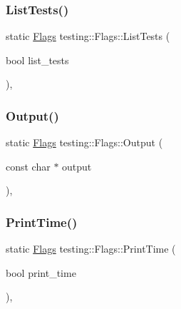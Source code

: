 \mbox{\label{structtesting_1_1Flags_a825a5d763a31fe6c28f543990bd336df}} 
\subsubsection{\texorpdfstring{ListTests()}{ListTests()}}
{\footnotesize\ttfamily static \mbox{\hyperlink{structtesting_1_1Flags}{Flags}} testing\+::\+Flags\+::\+List\+Tests (\begin{DoxyParamCaption}\item[{bool}]{list\+\_\+tests }\end{DoxyParamCaption})\hspace{0.3cm}{\ttfamily [inline]}, {\ttfamily [static]}}

\mbox{\label{structtesting_1_1Flags_a507916734a6d7ff2dd02891d7849f2d3}} 
\subsubsection{\texorpdfstring{Output()}{Output()}}
{\footnotesize\ttfamily static \mbox{\hyperlink{structtesting_1_1Flags}{Flags}} testing\+::\+Flags\+::\+Output (\begin{DoxyParamCaption}\item[{const char $\ast$}]{output }\end{DoxyParamCaption})\hspace{0.3cm}{\ttfamily [inline]}, {\ttfamily [static]}}

\mbox{\label{structtesting_1_1Flags_af4dc8454995fb3691399a049e95de179}} 
\subsubsection{\texorpdfstring{PrintTime()}{PrintTime()}}
{\footnotesize\ttfamily static \mbox{\hyperlink{structtesting_1_1Flags}{Flags}} testing\+::\+Flags\+::\+Print\+Time (\begin{DoxyParamCaption}\item[{bool}]{print\+\_\+time }\end{DoxyParamCaption})\hspace{0.3cm}{\ttfamily [inline]}, {\ttfamily [static]}}


